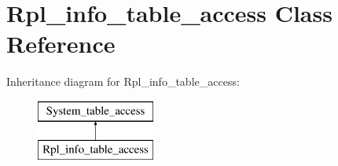 \hypertarget{classRpl__info__table__access}{}\section{Rpl\+\_\+info\+\_\+table\+\_\+access Class Reference}
\label{classRpl__info__table__access}
Inheritance diagram for Rpl\+\_\+info\+\_\+table\+\_\+access\+:\begin{figure}[H]
\begin{center}
\leavevmode
\includegraphics[height=2.000000cm]{classRpl__info__table__access}
\end{center}
\end{figure}
